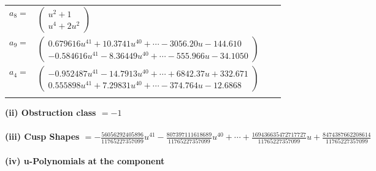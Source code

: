 \documentclass[1p]{elsarticle_modified}
\theoremstyle{definition}
\begin{document}
\begin{tabular}{m{7pt} m{180pt} m{7pt} m{180pt} }
\flushright $a_{8}=$&$\begin{pmatrix}u^2+1\\u^4+2 u^2\end{pmatrix}$ \\
\flushright $a_{9}=$&$\begin{pmatrix}0.679616 u^{41}+10.3741 u^{40}+\cdots-3056.20 u-144.610\\-0.584616 u^{41}-8.36449 u^{40}+\cdots-555.966 u-34.1050\end{pmatrix}$ \\
\flushright $a_{4}=$&$\begin{pmatrix}-0.952487 u^{41}-14.7913 u^{40}+\cdots+6842.37 u+332.671\\0.555898 u^{41}+7.29831 u^{40}+\cdots-374.764 u-12.6868\end{pmatrix}$\\&\end{tabular}
\flushleft \textbf{(ii) Obstruction class $= -1$}\\~\\
\flushleft \textbf{(iii) Cusp Shapes $= -\frac{56056292405896}{11765227357099} u^{41}-\frac{807397111618689}{11765227357099} u^{40}+\cdots+\frac{169436635472717727}{11765227357099} u+\frac{8474387662208614}{11765227357099}$}\\~\\
\newpage\renewcommand{\arraystretch}{1}
\flushleft \textbf{(iv) u-Polynomials at the component}\newline \\
\end{document}
